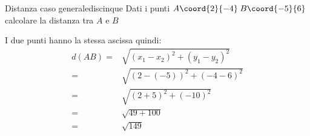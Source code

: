 \begin{esempiot}{Distanza caso generale}{discinque}
	Dati i punti $A\coord{2}{-4}$\,$B\coord{-5}{6}$ calcolare la distanza tra $A$ e $B$
\end{esempiot}
I due punti hanno la stessa ascissa quindi: 
\begin{align*}
d(AB)=&\sqrt{(x_1-x_2)^2+(y_1-y_2)^2}\\
=&\sqrt{(2-(-5))^2+(-4-6)^2}\\
=&\sqrt{(2+5)^2+(-10)^2}\\
=&\sqrt{49+100}\\
=&\sqrt{149}
\end{align*}


